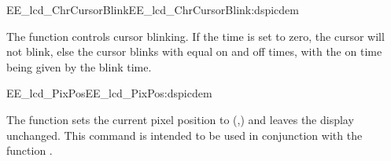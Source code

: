 \begin{function_nopb2}{EE\_lcd\_ChrCursorBlink}{EE_lcd_ChrCursorBlink:dspicdem}
  
  \begin{fundescription}
    The function controls cursor blinking. If the time is set to zero,
    the cursor will not blink, else the cursor blinks with equal on
    and off times, with the on time being given by the blink time.
  \end{fundescription}
  
  \begin{funparameters}
  \end{funparameters}
  
  
\end{function_nopb2}

\begin{function_nopb2}{EE\_lcd\_PixPos}{EE_lcd_PixPos:dspicdem}
  
  \begin{fundescription}
    The function sets the current pixel position to
    (,) and leaves the display unchanged. This
    command is intended to be used in conjunction with the function
    .
  \end{fundescription}
  
  \begin{funparameters}
  \end{funparameters}
  
  
\end{function_nopb2}

